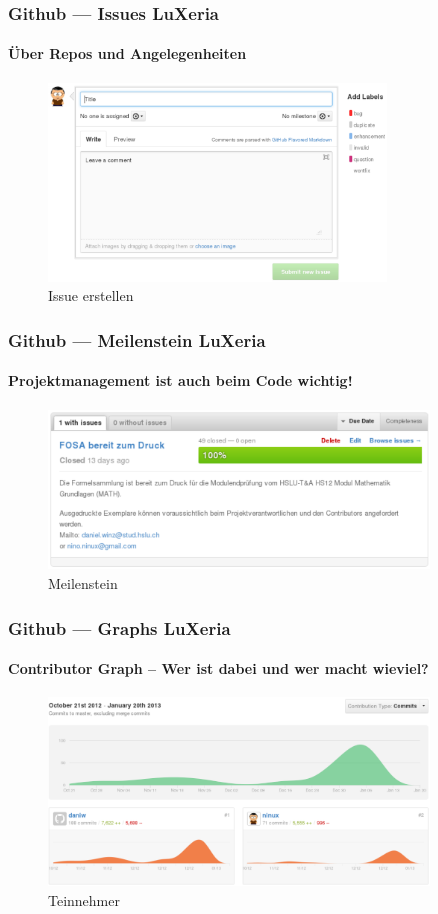 \begin{frame}
    \frametitle{Github --- Issues \hfill{} \footnotesize{LuXeria}}
    \framesubtitle{Über Repos und Angelegenheiten}
    \begin{figure}
        \includegraphics[width=0.8\textwidth]{github_issue.pdf}
        \caption{Issue erstellen}
    \end{figure}
\end{frame}

\begin{frame}
    \frametitle{Github --- Meilenstein \hfill{} \footnotesize{LuXeria}}
    \framesubtitle{Projektmanagement ist auch beim Code wichtig!}
    \begin{figure}
        \includegraphics[width=0.9\textwidth]{github_milestone.pdf}
        \caption{Meilenstein}
    \end{figure}
\end{frame}

\begin{frame}
    \frametitle{Github --- Graphs \hfill{} \footnotesize{LuXeria}}
    \framesubtitle{Contributor Graph -- Wer ist dabei und wer macht wieviel?}
    \begin{figure}
        \includegraphics[width=0.9\textwidth]{github_contributors.pdf}
        \caption{Teinnehmer}
    \end{figure}
\end{frame}

